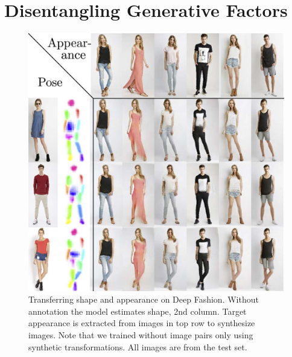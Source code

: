 \chapter{Disentangling Generative Factors}
	\begin{figure}[t]
		\centering
		\includegraphics[trim={0cm 0cm 0cm 0cm},clip, width=.7\linewidth]{fig/factor/swappy}
		\caption{Transferring shape and appearance on Deep Fashion. Without annotation the model estimates shape, 2nd column. Target appearance is extracted from images in top row to synthesize images. Note that we trained without image pairs only using synthetic transformations.
		All images are from the test set.}
		\label{fig:allswaps}
	\end{figure}

